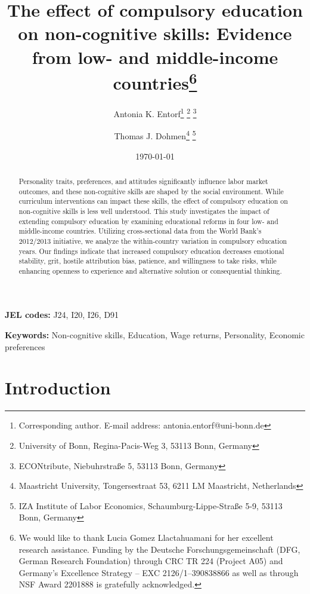 \documentclass[11pt, a4paper, leqno]{article}
\providecommand{\JEL}[1]
{
	\small
	\textbf{JEL codes:} #1
}
\providecommand{\keywords}[1]
{
	\small
	\textbf{Keywords:} #1
}
\begin{document}
\title{The effect of compulsory education on non-cognitive skills: Evidence from low- and middle-income countries\thanks{We would like to thank Lucia Gomez Llactahuamani for her excellent research assistance. Funding by the Deutsche Forschungsgemeinschaft (DFG, German Research Foundation) through CRC TR 224 (Project A05) and Germany’s Excellence Strategy – EXC 2126/1–390838866 as well as through NSF Award 2201888 is gratefully acknowledged.}}

\author{Antonia K. Entorf\thanks{Corresponding author. E-mail address: antonia.entorf@uni-bonn.de} \thanks{University of Bonn, Regina-Pacis-Weg 3, 53113 Bonn, Germany} \thanks{ECONtribute, Niebuhrstraße 5, 53113 Bonn, Germany} \and Thomas J. Dohmen\footnotemark[3] \footnotemark[4] \thanks{Maastricht University, Tongersestraat 53, 6211 LM Maastricht, Netherlands} \thanks{IZA Institute of Labor Economics, Schaumburg-Lippe-Straße 5-9, 53113 Bonn, Germany}}

\date{\today}

\maketitle


\begin{abstract}
    Personality traits, preferences, and attitudes significantly influence labor market outcomes, and these non-cognitive skills are shaped by the social environment. While curriculum interventions can impact these skills, the effect of compulsory education on non-cognitive skills is less well understood. This study investigates the impact of extending compulsory education by examining educational reforms in four low- and middle-income countries. Utilizing cross-sectional data from the World Bank's 2012/2013 initiative, we analyze the within-country variation in compulsory education years. Our findings indicate that increased compulsory education decreases emotional stability, grit, hostile attribution bias, patience, and willingness to take risks, while enhancing openness to experience and alternative solution or consequential thinking.
\end{abstract}


\JEL{J24, I20, I26, D91}

\keywords{Non-cognitive skills, Education, Wage returns, Personality, Economic preferences}

\clearpage

\section{Introduction} %

\end{document}
